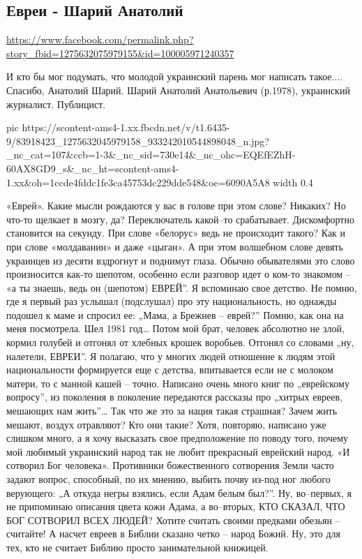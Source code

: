  
 
 
 
 

\subsection{Евреи - Шарий Анатолий}
\label{sec:04_02_2020.fb.alenkrig.1.sharij_evrej}
\url{https://www.facebook.com/permalink.php?story_fbid=1275632075979155&id=100005971240357}

И кто бы мог подумать, что молодой украинский парень мог написать такое....
Спасибо, Анатолий Шарий.  Шарий Анатолий Анатольевич (р.1978), украинский
журналист. Публицист.

\ifcmt
  pic https://scontent-ams4-1.xx.fbcdn.net/v/t1.6435-9/83918423_1275632045979158_933242010544898048_n.jpg?_nc_cat=107&ccb=1-3&_nc_sid=730e14&_nc_ohc=EQEfEZhH-60AX8GD9_s&_nc_ht=scontent-ams4-1.xx&oh=1ccde4fddc1fe3ca45753dc229dde548&oe=6090A5A8
  width 0.4
\fi

«Еврей». Какие мысли рождаются у вас в голове при этом слове? Никаких? Но
что-то щелкает в мозгу, да? Переключатель какой–то срабатывает. Дискомфортно
становится на секунду. При слове «белорус» ведь не происходит такого? Как и при
слове «молдаванин» и даже «цыган». А при этом волшебном слове девять украинцев
из десяти вздрогнут и поднимут глаза. Обычно обывателями это слово произносится
как-то шепотом, особенно если разговор идет о ком-то знакомом – «а ты знаешь,
ведь он (шепотом) ЕВРЕЙ”. Я вспоминаю свое детство. Не помню, где я первый раз
услышал (подслушал) про эту национальность, но однажды подошел к маме и спросил
ее: „Мама, а Брежнев – еврей?” Помню, как она на меня посмотрела. Шел 1981 год…
Потом мой брат, человек абсолютно не злой, кормил голубей и отгонял от хлебных
крошек воробьев. Отгонял со словами „ну, налетели, ЕВРЕИ”. Я полагаю, что у
многих людей отношение к людям этой национальности формируется еще с детства,
впитывается если не с молоком матери, то с манной кашей – точно.  Написано
очень много книг по „еврейскому вопросу”, из поколения в поколение передаются
рассказы про „хитрых евреев, мешающих нам жить”… Так что же это за нация такая
страшная? Зачем жить мешают, воздух отравляют? Кто они такие? Хотя, повторяю,
написано уже слишком много, а я хочу высказать свое предположение по поводу
того, почему мой любимый украинский народ так не любит прекрасный еврейский
народ. «И сотворил Бог человека». Противники божественного сотворения Земли
часто задают вопрос, способный, по их мнению, выбить почву из-под ног любого
верующего: „А откуда негры взялись, если Адам белым был?”. Ну, во–первых, я не
припоминаю описания цвета кожи Адама, а во–вторых, КТО СКАЗАЛ, ЧТО БОГ СОТВОРИЛ
ВСЕХ ЛЮДЕЙ? Хотите считать своими предками обезьян – считайте! А насчет евреев
в Библии сказано четко – народ Божий. Ну, это для тех, кто не считает Библию
просто занимательной книжицей. 

